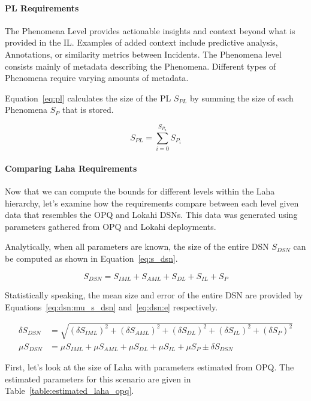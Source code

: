 \paragraph{PL Requirements}
The Phenomena Level provides actionable insights and context beyond what is provided in the IL. Examples of added context include predictive analysis, Annotations, or similarity metrics between Incidents. The Phenomena level consists mainly of metadata describing the Phenomena. Different types of Phenomena require varying amounts of metadata.

Equation~\ref{eq:pl} calculates the size of the PL $S_{PL}$ by summing the size of each Phenomena $S_{P}$ that is stored.

\begin{equation}\label{eq:pl}
	S_{PL} = \sum_{i=0}^{S_{P_{n}}} S_{P_{i}}
\end{equation}

\paragraph{Comparing Laha Requirements}

Now that we can compute the bounds for different levels within the Laha hierarchy, let's examine how the requirements compare between each level given data that resembles the OPQ and Lokahi DSNs. This data was generated using parameters gathered from OPQ and Lokahi deployments.

Analytically, when all parameters are known, the size of the entire DSN $S_{DSN}$ can be computed as shown in Equation~\ref{eq:s_dsn}.

\begin{equation}\label{eq:s_dsn}
	S_{DSN} = S_{IML} + S_{AML} + S_{DL} + S_{IL} + S_{P}
\end{equation}

Statistically speaking, the mean size and error of the entire DSN are provided by Equations~\ref{eq:dsn:mu_s_dsn} and~\ref{eq:dsn:e} respectively.

\begin{align}
	\delta S_{DSN} &= \sqrt{(\delta S_{IML})^2 + (\delta S_{AML})^2 + (\delta S_{DL})^2 + (\delta S_{IL})^2 + (\delta S_{P})^2} \label{eq:dsn:e} \\
	\mu S_{DSN} &= \mu S_{IML} + \mu S_{AML} + \mu S_{DL} + \mu S_{IL} + \mu S_{P} \pm \delta S_{DSN} \label{eq:dsn:mu_s_dsn}
\end{align}

First, let's look at the size of Laha with parameters estimated from OPQ. The estimated parameters for this scenario are given in Table~\ref{table:estimated_laha_opq}.

